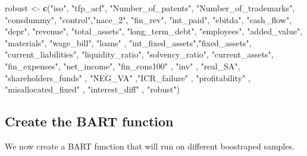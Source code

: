 \documentclass[]{article}
\newenvironment{Shaded}{\begin{snugshade}}{\end{snugshade}}
\newcommand{\ControlFlowTok}[1]{\textcolor[rgb]{0.13,0.29,0.53}{\textbf{#1}}}
\newcommand{\DataTypeTok}[1]{\textcolor[rgb]{0.13,0.29,0.53}{#1}}
\newcommand{\DecValTok}[1]{\textcolor[rgb]{0.00,0.00,0.81}{#1}}
\newcommand{\KeywordTok}[1]{\textcolor[rgb]{0.13,0.29,0.53}{\textbf{#1}}}
\newcommand{\NormalTok}[1]{#1}
\newcommand{\OperatorTok}[1]{\textcolor[rgb]{0.81,0.36,0.00}{\textbf{#1}}}
\newcommand{\OtherTok}[1]{\textcolor[rgb]{0.56,0.35,0.01}{#1}}
\newcommand{\StringTok}[1]{\textcolor[rgb]{0.31,0.60,0.02}{#1}}
\begin{document}
\begin{Shaded}
\begin{Highlighting}[]
\NormalTok{robust <-}\StringTok{ }\KeywordTok{c}\NormalTok{(}\StringTok{"iso"}\NormalTok{, }\StringTok{"tfp_acf"}\NormalTok{, }\StringTok{"Number_of_patents"}\NormalTok{, }\StringTok{"Number_of_trademarks"}\NormalTok{,}
  \StringTok{"consdummy"}\NormalTok{, }\StringTok{"control"}\NormalTok{,}\StringTok{"nace_2"}\NormalTok{, }\StringTok{"fin_rev"}\NormalTok{, }\StringTok{"int_paid"}\NormalTok{, }\StringTok{"ebitda"}\NormalTok{, }\StringTok{"cash_flow"}\NormalTok{,}
  \StringTok{"depr"}\NormalTok{, }\StringTok{"revenue"}\NormalTok{, }\StringTok{"total_assets"}\NormalTok{, }\StringTok{"long_term_debt"}\NormalTok{, }\StringTok{"employees"}\NormalTok{, }\StringTok{"added_value"}\NormalTok{,}
  \StringTok{"materials"}\NormalTok{, }\StringTok{"wage_bill"}\NormalTok{, }\StringTok{"loans"}\NormalTok{ , }\StringTok{"int_fixed_assets"}\NormalTok{,}\StringTok{"fixed_assets"}\NormalTok{,}
  \StringTok{"current_liabilities"}\NormalTok{,  }\StringTok{"liquidity_ratio"}\NormalTok{,  }\StringTok{"solvency_ratio"}\NormalTok{, }\StringTok{"current_assets"}\NormalTok{,}
  \StringTok{"fin_expenses"}\NormalTok{, }\StringTok{"net_income"}\NormalTok{,  }\StringTok{"fin_cons100"}\NormalTok{ , }\StringTok{"inv"}\NormalTok{ , }\StringTok{"real_SA"}\NormalTok{, }\StringTok{"shareholders_funds"}\NormalTok{ ,}
  \StringTok{"NEG_VA"}\NormalTok{ ,}\StringTok{"ICR_failure"}\NormalTok{ , }\StringTok{"profitability"}\NormalTok{ ,  }\StringTok{"misallocated_fixed"}\NormalTok{ , }\StringTok{"interest_diff"}\NormalTok{ ,}
  \StringTok{"robust"}\NormalTok{)}
\end{Highlighting}
\end{Shaded}

\hypertarget{create-the-bart-function}{%
\subsection{Create the BART function}\label{create-the-bart-function}}

We now create a BART function that will run on different boostraped
samples.

\begin{Shaded}
\end{Shaded}
\end{document}
